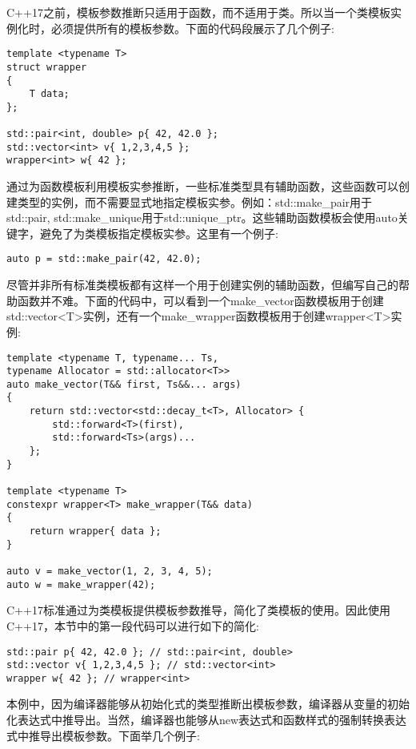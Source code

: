 C++17之前，模板参数推断只适用于函数，而不适用于类。所以当一个类模板实例化时，必须提供所有的模板参数。下面的代码段展示了几个例子:

\begin{lstlisting}[style=styleCXX]
template <typename T>
struct wrapper
{
	T data;
};

std::pair<int, double> p{ 42, 42.0 };
std::vector<int> v{ 1,2,3,4,5 };
wrapper<int> w{ 42 };
\end{lstlisting}

通过为函数模板利用模板实参推断，一些标准类型具有辅助函数，这些函数可以创建类型的实例，而不需要显式地指定模板实参。例如：std::make\_pair用于std::pair, std::make\_unique用于std::unique\_ptr。这些辅助函数模板会使用auto关键字，避免了为类模板指定模板实参。这里有一个例子:

\begin{lstlisting}[style=styleCXX]
auto p = std::make_pair(42, 42.0);
\end{lstlisting}

尽管并非所有标准类模板都有这样一个用于创建实例的辅助函数，但编写自己的帮助函数并不难。下面的代码中，可以看到一个make\_vector函数模板用于创建std::vector<T>实例，还有一个make\_wrapper函数模板用于创建wrapper<T>实例:

\begin{lstlisting}[style=styleCXX]
template <typename T, typename... Ts,
typename Allocator = std::allocator<T>>
auto make_vector(T&& first, Ts&&... args)
{
	return std::vector<std::decay_t<T>, Allocator> {
		std::forward<T>(first),
		std::forward<Ts>(args)...
	};
}

template <typename T>
constexpr wrapper<T> make_wrapper(T&& data)
{
	return wrapper{ data };
}

auto v = make_vector(1, 2, 3, 4, 5);
auto w = make_wrapper(42);
\end{lstlisting}

C++17标准通过为类模板提供模板参数推导，简化了类模板的使用。因此使用C++17，本节中的第一段代码可以进行如下的简化:

\begin{lstlisting}[style=styleCXX]
std::pair p{ 42, 42.0 }; // std::pair<int, double>
std::vector v{ 1,2,3,4,5 }; // std::vector<int>
wrapper w{ 42 }; // wrapper<int>
\end{lstlisting}

本例中，因为编译器能够从初始化式的类型推断出模板参数，编译器从变量的初始化表达式中推导出。当然，编译器也能够从new表达式和函数样式的强制转换表达式中推导出模板参数。下面举几个例子:

